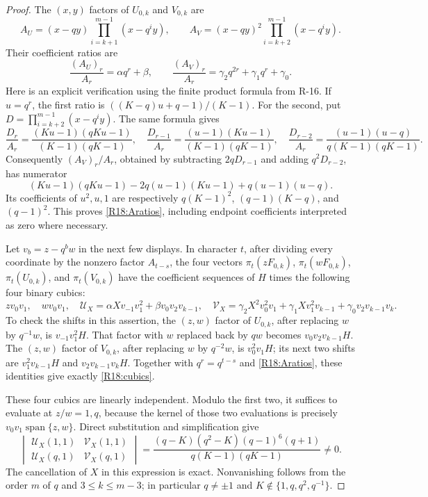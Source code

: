 \documentclass[11pt,a4paper]{article}
\theoremstyle{definition}\newtheorem{definition}{Definition}
\begin{document}
\begin{proof}
The $(x,y)$ factors of $U_{0,k}$ and $V_{0,k}$ are
\[
 A_U=(x-qy)\prod_{i=k+1}^{m-1}(x-q^iy),\qquad
 A_V=(x-qy)^2\prod_{i=k+2}^{m-1}(x-q^iy).
\]
Their coefficient ratios are
\begin{equation}\label{R18:Aratios}
 \frac{(A_U)_r}{A_r}=\alpha q^r+\beta,
 \qquad
 \frac{(A_V)_r}{A_r}
    =\gamma_2 q^{2r}+\gamma_1 q^r+\gamma_0.
\end{equation}
Here is an explicit verification using the finite product
formula from R-16. If $u=q^r$, the first ratio is
$((K-q)u+q-1)/(K-1)$. For the second, put
$D=\prod_{i=k+2}^{m-1}(x-q^iy)$.
The same formula gives
\[
 \frac{D_r}{A_r}
  =\frac{(Ku-1)(qKu-1)}{(K-1)(qK-1)},\quad
 \frac{D_{r-1}}{A_r}
  =\frac{(u-1)(Ku-1)}{(K-1)(qK-1)},\quad
 \frac{D_{r-2}}{A_r}
  =\frac{(u-1)(u-q)}{q(K-1)(qK-1)}.
\]
Consequently $(A_V)_r/A_r$, obtained by subtracting
$2qD_{r-1}$ and adding $q^2D_{r-2}$, has numerator
\[
 (Ku-1)(qKu-1)-2q(u-1)(Ku-1)+q(u-1)(u-q).
\]
Its coefficients of $u^2,u,1$ are respectively
$q(K-1)^2$, $(q-1)(K-q)$, and $(q-1)^2$.
This proves \eqref{R18:Aratios}, including endpoint
coefficients interpreted as zero where necessary.

Let $v_b=z-q^bw$ in the next few displays. In character
$t$, after dividing every coordinate by the nonzero factor
$A_{t-s}$, the four vectors
$\pi_t(zF_{0,k})$, $\pi_t(wF_{0,k})$,
$\pi_t(U_{0,k})$, and $\pi_t(V_{0,k})$ have the coefficient
sequences of $H$ times the following four binary cubics:
\begin{equation}\label{R18:cubics}
 zv_0v_1,\quad wv_0v_1,\quad
 \mathcal U_X=\alpha Xv_{-1}v_1^2+\beta v_0v_2v_{k-1},\quad
 \mathcal V_X=\gamma_2X^2v_0^2v_1
               +\gamma_1Xv_1^2v_{k-1}
               +\gamma_0v_2v_{k-1}v_k.
\end{equation}
To check the shifts in this assertion, the $(z,w)$ factor
of $U_{0,k}$, after replacing $w$ by $q^{-1}w$, is
$v_{-1}v_1^2H$. That factor with $w$ replaced back by
$qw$ becomes $v_0v_2v_{k-1}H$.
The $(z,w)$ factor of $V_{0,k}$, after replacing $w$ by
$q^{-2}w$, is $v_0^2v_1H$; its next two shifts are
$v_1^2v_{k-1}H$ and $v_2v_{k-1}v_kH$.
Together with $q^r=q^{t-s}$ and
\eqref{R18:Aratios}, these identities give exactly
\eqref{R18:cubics}.

These four cubics are linearly independent. Modulo the
first two, it suffices to evaluate at $z/w=1,q$, because
the kernel of those two evaluations is precisely
$v_0v_1\operatorname{span}\{z,w\}$.
Direct substitution and simplification give
\begin{equation}\label{R18:evaldet}
 \begin{vmatrix}
 \mathcal U_X(1,1)&\mathcal V_X(1,1)\\
 \mathcal U_X(q,1)&\mathcal V_X(q,1)
 \end{vmatrix}
 =\frac{(q-K)(q^2-K)(q-1)^6(q+1)}
        {q(K-1)(qK-1)}\ne0.
\end{equation}
The cancellation of $X$ in this expression is exact.
Nonvanishing follows from the order $m$ of $q$ and
$3\leq k\leq m-3$; in particular $q\ne\pm1$ and
$K\notin\{1,q,q^2,q^{-1}\}$.


\end{proof}
\end{document}
